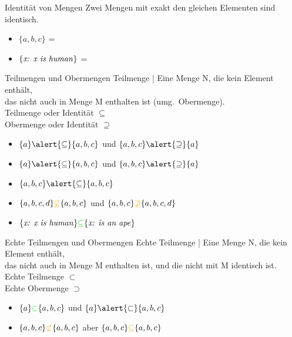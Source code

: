 \begin{frame}
  {Identität von Mengen}
  \onslide<+->
  \onslide<+->
  Zwei Mengen mit exakt den gleichen Elementen sind \alert{identisch}.\\
  \Zeile 
  \begin{itemize}[<+->]
    \item \alert{$\{a,b,c\}$} = 
      \Halbzeile
    \item \alert{$\{\text{\textit{x: x is human}}\}$} = 
  \end{itemize}
\end{frame}

\begin{frame}
  {Teilmengen und Obermengen}
  \onslide<+->
  \onslide<+->
  \alert{Teilmenge} | Eine Menge N, die kein Element enthält,\\
  das nicht auch in Menge M enthalten ist (umg.\ \alert{Obermenge}).\\
  \Halbzeile
  \onslide<+->
  Teilmenge oder Identität $\subseteq$\\
  Obermenge oder Identität $\supseteq$\\
  \Zeile
  \begin{itemize}[<+->]
    \item $\{a\}\alert{\subseteq}\{a,b,c\}$ und $\{a,b,c\}\alert{\supseteq}\{a\}$
    \item $\{a\} \alert{\subseteq}\{a,b,c\}$ und $\{a,b,c\}\alert{\supseteq}\{a\}$
    \item $\{a,b,c\}\alert{\subseteq}\{a,b,c\}$
      \Halbzeile
    \item $\{a,b,c,d\}\orongsch{\not\subseteq}\{a,b,c\}$ und $\{a,b,c\}\orongsch{\not\supseteq}\{a,b,c,d\}$
      \Halbzeile
    \item $\{\text{\textit{x: x is human}}\}\gruen{\subseteq}\{\text{\textit{x: is an ape}}\}$
  \end{itemize}
\end{frame}


\begin{frame}
  {Echte Teilmengen und Obermengen}
  \onslide<+->
  \onslide<+->
  \alert{Echte Teilmenge} | Eine Menge N, die kein Element enthält,\\
  das nicht auch in Menge M enthalten ist, und die nicht mit M identisch ist.\\
  \Halbzeile
  \onslide<+->
  Echte Teilmenge $\subset$\\
  Echte Obermenge $\supset$\\
  \Zeile
  \begin{itemize}[<+->]
    \item $\{a\}\gruen{\subset}\{a,b,c\}$ und $\{a\}\alert{\subset}\{a,b,c\}$
    \item $\{a,b,c\}\orongsch{\not\subset}\{a,b,c\}$ aber $\{a,b,c\}\orongsch{\subseteq}\{a,b,c\}$
  \end{itemize}
\end{frame}

